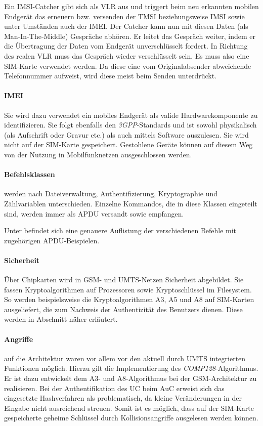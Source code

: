 Ein IMSI-Catcher gibt sich als \ac{VLR} aus und triggert beim neu
erkannten mobilen Endgerät das erneuern bzw. versenden der \ac{TMSI}
beziehungsweise \ac{IMSI} sowie unter Umständen auch der \ac{IMEI}. Der Catcher
kann nun mit diesen Daten (als Man-In-The-Middle) Gespräche abhören.
Er leitet das Gespräch weiter, indem er die Übertragung der Daten
vom Endgerät unverschlüsselt fordert. In Richtung des realen \ac{VLR}
muss das Gespräch wieder verschlüsselt sein. Es muss also eine SIM-Karte
verwendet werden. Da diese eine vom Originalabsender abweichende
Telefonnummer aufweist, wird diese meist beim Senden unterdrückt.

\paragraph{IMEI} Sie wird dazu verwendet ein mobiles Endgerät als
valide Hardwarekomponente zu identifizieren. Sie folgt ebenfalls
den \textit{3GPP}-Standards und ist sowohl physikalisch (als
Aufschrift oder Gravur etc.) als auch mittels Software auszulesen.
Sie wird nicht auf der SIM-Karte gespeichert. %
Gestohlene Geräte können auf diesem Weg von der Nutzung in
Mobilfunknetzen ausgeschlossen werden. 

\paragraph{Befehlsklassen} werden nach Dateiverwaltung, Authentifizierung, Kryptographie
und Zählvariablen unterschieden\cite{spitz11}. Einzelne Kommandos, die in diese
Klassen eingeteilt sind, werden immer als \ac{APDU} versandt sowie empfangen.

Unter  befindet sich eine genauere
Auflistung der verschiedenen Befehle mit zugehörigen \ac{APDU}-Beispielen.

\paragraph{Sicherheit}
Über Chipkarten wird in \ac{GSM}- und \ac{UMTS}-Netzen Sicherheit abgebildet.
Sie fassen Kryptoalgorithmen auf Prozessoren sowie Kryptoschlüssel im
Filesystem. So werden beispielsweise die Kryptoalgorithmen A3, A5 und A8
auf SIM-Karten ausgeliefert, die zum Nachweis der Authentizität des Benutzers dienen.
Diese werden in Abschnitt 
näher erläutert.

\paragraph{Angriffe} auf die Architektur waren vor allem vor den aktuell durch UMTS
integrierten Funktionen möglich. Hierzu gilt die Implementierung des \textit{COMP128}-Algorithmus.
Er ist dazu entwickelt dem A3- und A8-Algorithmus bei der GSM-Architektur zu realisieren.
Bei der Authentifikation des UC beim \ac{AuC} erweist sich das eingesetzte Hashverfahren
als problematisch, da kleine Veränderungen in der Eingabe nicht ausreichend streuen. Somit
ist es möglich, dass auf der SIM-Karte gespeicherte geheime Schlüssel durch Kollisionsangriffe
ausgelesen werden können.

